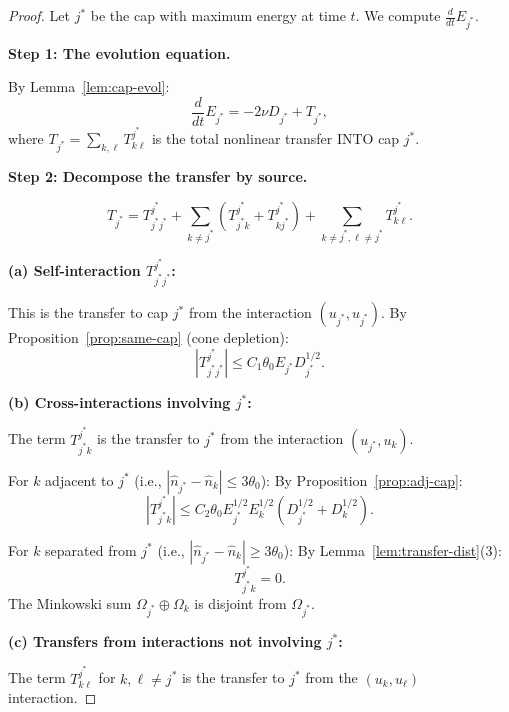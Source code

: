 \documentclass[11pt]{article}
\theoremstyle{definition}
\begin{document}
\begin{proof}
Let $j^*$ be the cap with maximum energy at time $t$. We compute $\frac{d}{dt}E_{j^*}$.

\textbf{Step 1: The evolution equation.}

By Lemma~\ref{lem:cap-evol}:
\begin{equation}
\frac{d}{dt}E_{j^*} = -2\nu D_{j^*} + T_{j^*},
\end{equation}
where $T_{j^*} = \sum_{k, \ell} T_{k\ell}^{j^*}$ is the total nonlinear transfer INTO cap $j^*$.

\textbf{Step 2: Decompose the transfer by source.}

\begin{equation}
T_{j^*} = T_{j^* j^*}^{j^*} + \sum_{k \neq j^*} (T_{j^* k}^{j^*} + T_{k j^*}^{j^*}) + \sum_{k \neq j^*, \ell \neq j^*} T_{k\ell}^{j^*}.
\end{equation}

\textbf{(a) Self-interaction $T_{j^* j^*}^{j^*}$:}

This is the transfer to cap $j^*$ from the interaction $(u_{j^*}, u_{j^*})$. By Proposition~\ref{prop:same-cap} (cone depletion):
\begin{equation}
|T_{j^* j^*}^{j^*}| \leq C_1 \theta_0 E_{j^*} D_{j^*}^{1/2}.
\end{equation}

\textbf{(b) Cross-interactions involving $j^*$:}

The term $T_{j^* k}^{j^*}$ is the transfer to $j^*$ from the interaction $(u_{j^*}, u_k)$.

For $k$ adjacent to $j^*$ (i.e., $|\hat{n}_{j^*} - \hat{n}_k| \leq 3\theta_0$): By Proposition~\ref{prop:adj-cap}:
\begin{equation}
|T_{j^* k}^{j^*}| \leq C_2 \theta_0 E_{j^*}^{1/2} E_k^{1/2} (D_{j^*}^{1/2} + D_k^{1/2}).
\end{equation}

For $k$ separated from $j^*$ (i.e., $|\hat{n}_{j^*} - \hat{n}_k| \geq 3\theta_0$): By Lemma~\ref{lem:transfer-dist}(3):
\begin{equation}
T_{j^* k}^{j^*} = 0.
\end{equation}
The Minkowski sum $\Omega_{j^*} \oplus \Omega_k$ is disjoint from $\Omega_{j^*}$.

\textbf{(c) Transfers from interactions not involving $j^*$:}

The term $T_{k\ell}^{j^*}$ for $k, \ell \neq j^*$ is the transfer to $j^*$ from the $(u_k, u_\ell)$ interaction.


\end{proof}
\end{document}
